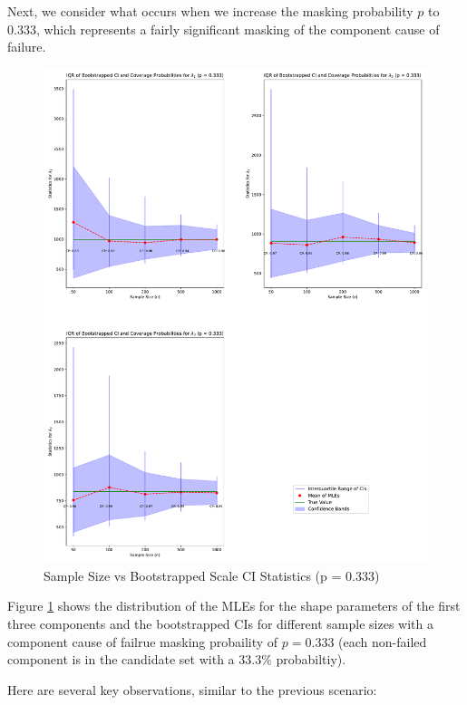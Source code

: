 \documentclass[
]{article}
\begin{document}
Next, we consider what occurs when we increase the masking probability
\(p\) to \(0.333\), which represents a fairly significant masking of the
component cause of failure.

\begin{figure}

{\centering \includegraphics{image/plot-n-vs-stats-p333-scale} 

}

\caption{Sample Size vs Bootstrapped Scale CI Statistics (p = 0.333)}\label{fig:samp-size-n-vs-stats-p333-scale}
\end{figure}

Figure \ref{fig:samp-size-n-vs-stats-p333-scale} shows the distribution
of the MLEs for the shape parameters of the first three components and
the bootstrapped CIs for different sample sizes with a component cause
of failrue masking probaility of \(p = 0.333\) (each non-failed
component is in the candidate set with a \(33.3\%\) probabiltiy).

Here are several key observations, similar to the previous scenario:
\end{document}
